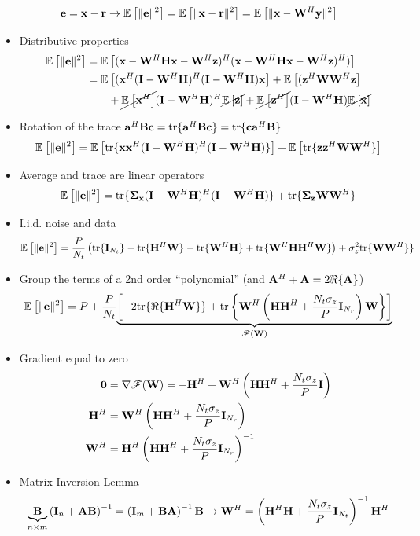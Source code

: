 \documentclass[xcolor=dvipsnames,aspectratio=169]{beamer}
\begin{document}
{    \vspace{-.1in}
    \begin{definition}
     $$\e=\x-\rr\to\Ex{}{\|\e\|^2}=\Ex{}{\|\x-\rr\|^2}=\Ex{}{\|\x-\W^H\y\|^2}$$
    \end{definition}
    \begin{itemize}
     \item Distributive properties
     \begin{equation*}
        \begin{split}
        \Ex{}{\|\e\|^2}&=\Ex{}{(\x-\W^H\Hb\x-\W^H\z)^H(\x-\W^H\Hb\x-\W^H\z)^H)}\\
                        &=\Ex{}{(\x^H(\I-\W^H\Hb)^H(\I-\W^H\Hb)\x}+\Ex{}{(\z^H\W\W^H\z}\\
                        &\qquad+\cancel{\Ex{}{\x^H}}(\I-\W^H\Hb)^H\cancel{\Ex{}{\z}}+\cancel{\Ex{}{\z^H}}(\I-\W^H\Hb)\cancel{\Ex{}{\x}}\\
        \end{split}
     \end{equation*}
     \item Rotation of the trace $\ab^H\B\cc=\tr\{\ab^H\B\cc\}=\tr\{\cc\ab^H\B\}$
     $$\Ex{}{\|\e\|^2}=\Ex{}{\tr\{\x\x^H(\I-\W^H\Hb)^H(\I-\W^H\Hb)\}}+\Ex{}{\tr\{\z\z^H\W\W^H\}}$$
     \item Average and trace are linear operators
     $$\Ex{}{\|\e\|^2}=\tr\{\Sg_{\x}(\I-\W^H\Hb)^H(\I-\W^H\Hb)\}+\tr\{\Sg_{\z}\W\W^H\}$$
     \item I.i.d. noise and data 
     $$\Ex{}{\|\e\|^2}=\frac{P}{N_t}\left(\tr\{\I_{N_t}\}-\tr\{\Hb^H\W\}-\tr\{\W^H\Hb\}+\tr\{\W^H\Hb\Hb^H\W\}\right)+\sigma_z^2\tr\{\W\W^H\}\}$$
     \item Group the terms of a 2nd order ``polynomial'' (and $\A^H+\A=2\Re\{\A\}$)
     $$\Ex{}{\|\e\|^2}=P+\frac{P}{N_t}\underset{\mathscr{F}(\W)}{\underbrace{\left[-2\tr\{\Re\{\Hb^H\W\}\}+\tr\left\{\W^H\left(\Hb\Hb^H+\frac{N_t\sigma_z}{P}\I_{N_{r}}\right)\W\right\}\right]}}$$
     \item Gradient equal to zero
       \begin{equation*}
        \begin{split}
        \zero &= \nabla \mathscr{F}(\W) =-\Hb^H+\W^H\left(\Hb\Hb^H+\frac{N_t\sigma_z}{P}\I\right)\\
                        \Hb^H&=\W^H\left(\Hb\Hb^H+\frac{N_t\sigma_z}{P}\I_{N_{r}}\right)\\
                        \W^H&=\Hb^H\left(\Hb\Hb^H+\frac{N_t\sigma_z}{P}\I_{N_{r}}\right)^{-1}\\
        \end{split}
        \end{equation*}
     \item Matrix Inversion Lemma
     $$\underset{n\times m}{\underbrace{\B}}\left(\I_{n}+\A\B\right)^{-1}=\left(\I_{m}+\B\A\right)^{-1}\B\to \W^H=\left(\Hb^H\Hb+\frac{N_t\sigma_z}{P}\I_{N_t}\right)^{-1}\Hb^H$$
    \end{itemize}
    
}
\end{document}
